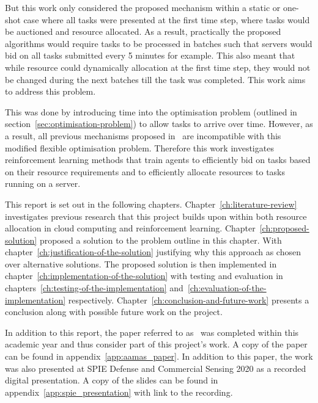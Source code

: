 But this work only considered the proposed mechanism within a static or one-shot case where all tasks were presented
at the first time step, where tasks would be auctioned and resource allocated. As a result, practically the proposed
algorithms would require tasks to be processed in batches such that servers would bid on all tasks submitted every 5
minutes for example. This also meant that while resource could dynamically allocation at the first time step, they
would not be changed during the next batches till the task was completed. This work aims to address this problem.

This was done by introducing time into the optimisation problem (outlined in section~\ref{sec:optimisation-problem})
to allow tasks to arrive over time. However, as a result, all previous mechanisms proposed
in~\cite{FlexibleResourceAllocation} are incompatible with this modified flexible optimisation problem. Therefore this
work investigates reinforcement learning methods that train agents to efficiently bid on tasks based on their resource
requirements and to efficiently allocate resources to tasks running on a server.

This report is set out in the following chapters. Chapter~\ref{ch:literature-review} investigates previous research
that this project builds upon within both resource allocation in cloud computing and reinforcement learning.
Chapter~\ref{ch:proposed-solution} proposed a solution to the problem outline in this chapter.
With chapter~\ref{ch:justification-of-the-solution} justifying why this approach as chosen over alternative solutions.
The proposed solution is then implemented in chapter~\ref{ch:implementation-of-the-solution} with testing and
evaluation in chapters~\ref{ch:testing-of-the-implementation} and~\ref{ch:evaluation-of-the-implementation} respectively.
Chapter~\ref{ch:conclusion-and-future-work} presents a conclusion along with possible future work on the project.

In addition to this report, the paper referred to as~\cite{FlexibleResourceAllocation} was completed within this
academic year and thus consider part of this project's work. A copy of the paper can be found in
appendix~\ref{app:aamas_paper}. In addition to this paper, the work was also presented at SPIE Defense and Commercial
Sensing 2020 as a recorded digital presentation. A copy of the slides can be found in
appendix~\ref{app:spie_presentation} with link to the recording.

